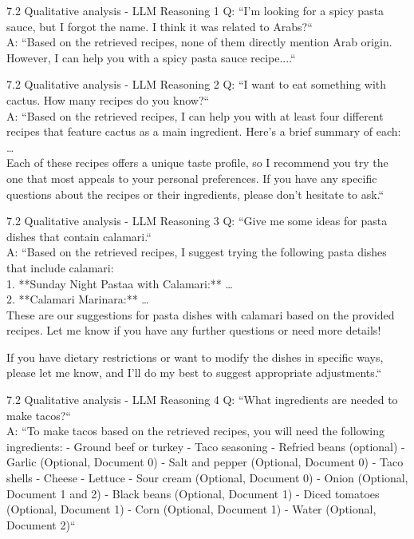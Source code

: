 \documentclass{beamer}
\begin{document}
\begin{frame}{7.2 Qualitative analysis - LLM Reasoning 1}
  Q: ``I'm looking for a spicy pasta sauce, but I forgot the name. I think it was related to Arabs?``\\
  A: ``Based on the retrieved recipes, none of them directly mention Arab origin. However,
  I can help you with a spicy pasta sauce recipe....``
\end{frame}

\begin{frame}{7.2 Qualitative analysis - LLM Reasoning 2}
  Q: ``I want to eat something with cactus. How many recipes do you know?``\\
  A: ``Based on the retrieved recipes, I can help you with at least four different recipes that feature cactus as a main ingredient. Here's a brief summary of each:\\
  \ldots \\
  Each of these recipes offers a unique taste profile, so I recommend you try the one that most appeals to your personal preferences. If you have any specific questions about the recipes or their ingredients, please don't hesitate to ask.``
\end{frame}

\begin{frame}{7.2 Qualitative analysis - LLM Reasoning 3}
  Q: ``Give me some ideas for pasta dishes that contain calamari.``\\
  A: ``Based on the retrieved recipes, I suggest trying the following pasta dishes that include calamari:\\
  1. **Sunday Night Pastaa with Calamari:** \ldots\\
  2. **Calamari Marinara:** \ldots\\

  These are our suggestions for pasta dishes with calamari based on the provided recipes. Let me know if you have any further questions or need more details!

  If you have dietary restrictions or want to modify the dishes in specific ways, please let me know, and I'll do my best to suggest appropriate adjustments.``
\end{frame}

\begin{frame}{7.2 Qualitative analysis - LLM Reasoning 4}
  Q: ``What ingredients are needed to make tacos?``\\
  A: ``To make tacos based on the retrieved recipes, you will need the following ingredients:
  - Ground beef or turkey
  - Taco seasoning
  - Refried beans (optional)
  - Garlic (Optional, Document 0)
  - Salt and pepper (Optional, Document 0)
  - Taco shells
  - Cheese
  - Lettuce
  - Sour cream (Optional, Document 0)
  - Onion (Optional, Document 1 and 2)
  - Black beans (Optional, Document 1)
  - Diced tomatoes (Optional, Document 1)
  - Corn (Optional, Document 1)
  - Water (Optional, Document 2)``
\end{frame}
\end{document}
